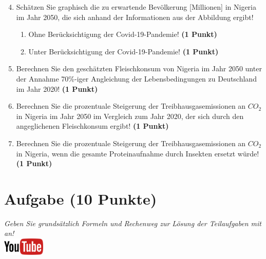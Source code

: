 \documentclass[a4paper, 9pt]{scrartcl}\usepackage[]{graphicx}\usepackage[]{xcolor}
\begin{document}
\begin{enumerate}
  \setcounter{enumi}{3}  
\item Sch{\"a}tzen Sie graphisch die zu erwartende Bev{\"o}lkerung [Millionen] in Nigeria im
  Jahr 2050, die sich anhand der Informationen aus der Abbildung ergibt!
\begin{enumerate}
\item Ohne Ber{\"u}cksichtigung der Covid-19-Pandemie! \textbf{(1
    Punkt)}
\item Unter Ber{\"u}cksichtigung der Covid-19-Pandemie! \textbf{(1
    Punkt)}
\end{enumerate}
\item Berechnen Sie den gesch{\"a}tzten Fleischkonsum von Nigeria im Jahr
  2050 unter der Annahme 70\%-iger Angleichung der Lebensbedingungen zu
  Deutschland im Jahr 2020! \textbf{(1 Punkt)}
\item Berechnen Sie die prozentuale Steigerung der Treibhausgasemissionen
  an $CO_2$ in Nigeria im Jahr 2050 im Vergleich zum Jahr 2020, der
  sich durch den angeglichenen Fleischkonsum ergibt! \textbf{(1 Punkt)}
\item Berechnen Sie die prozentuale Steigerung der Treibhausgasemissionen
  an $CO_2$ in Nigeria, wenn die gesamte Proteinaufnahme 
  durch Insekten ersetzt w{\"u}rde! \textbf{(1
    Punkt)}
\end{enumerate}







 
\clearpage

\section{Aufgabe \hfill (10 Punkte)}

\textit{Geben Sie grunds{\"a}tzlich Formeln und Rechenweg zur L{\"o}sung der
  Teilaufgaben mit an!} \\[1Ex]

\hfill\href{https://youtu.be/8Pb2sKUIMyk}{\includegraphics[width =
  2cm]{img/youtube}} %
\hspace{2Ex}
\end{document}
